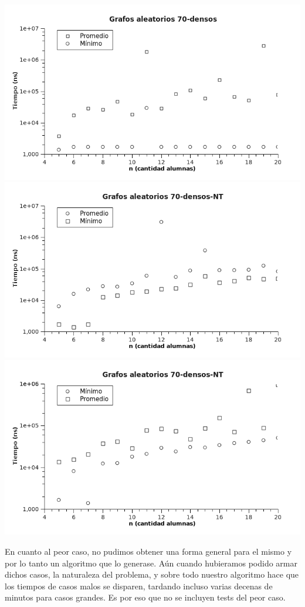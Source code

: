\includegraphics[scale=0.8]{img/ej2/tests/70d_lote2.png}
\newline
\includegraphics[scale=0.8]{img/ej2/tests/70d_nt_lote1.png}
\newline
\includegraphics[scale=0.8]{img/ej2/tests/70d_nt_lote2.png}
\newline

En cuanto al peor caso, no pudimos obtener una forma general para el mismo y por lo tanto un algoritmo que lo generase. Aún cuando hubieramos podido armar dichos casos, la naturaleza 
del problema, y sobre todo nuestro algoritmo hace que los tiempos de casos malos se disparen, tardando incluso varias decenas de minutos para casos grandes. Es por eso que no se incluyen tests 
del peor caso.